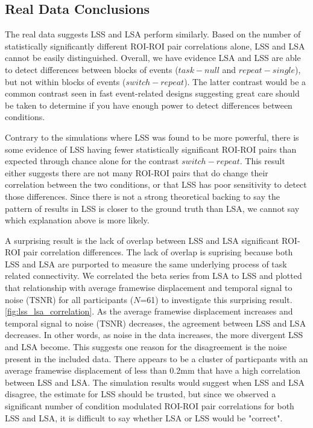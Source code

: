 \documentclass[10pt,letterpaper]{article}
\begin{document}
\subsection*{Real Data Conclusions}
\label{discussion:taskswitching-conclusions}

The real data suggests LSS and LSA perform similarly.
Based on the number of statistically significantly different ROI-ROI pair correlations alone,
LSS and LSA cannot be easily distinguished.
Overall, we have evidence LSA and LSS are able to detect differences between
blocks of events ($task - null$ and $repeat - single$), but not within blocks of events ($switch - repeat$).
The latter contrast would be a common contrast seen in fast event-related designs suggesting
great care should be taken to determine if you have enough power to detect differences
between conditions.

Contrary to the simulations where LSS was found to be more powerful,
there is some evidence of LSS having fewer statistically significant ROI-ROI pairs than expected through chance alone
for the contrast $switch - repeat$.
This result either suggests there are not many ROI-ROI pairs that do change their correlation
between the two conditions, or that LSS has poor sensitivity to detect those differences.
Since there is not a strong theoretical backing to say the pattern of results
in LSS is closer to the ground truth than LSA, we cannot say which
explanation above is more likely.

A surprising result is the lack of overlap between LSS and LSA significant ROI-ROI pair correlation differences.
The lack of overlap is suprising because both LSS and LSA are purported to
measure the same underlying process of task related connectivity.
We correlated the beta series from LSA to LSS and plotted that relationship with
average framewise displacement and temporal signal to noise (TSNR) for all participants ($N$=61) to investigate this surprising result. \ref{fig:lss_lsa_correlation}.
As the average framewise displacement increases and temporal signal to noise (TSNR)
decreases, the agreement between LSS and LSA decreases.
In other words, as noise in the data increases, the more divergent LSS and LSA become.
This suggests one reason for the disagreement is the noise present in the included
data.
There appears to be a cluster of particpants with an average framewise displacement of
less than 0.2mm that have a high correlation between LSS and LSA.
The simulation results would suggest when LSS and LSA disagree, the estimate for LSS should be
trusted, but since we observed a significant number of condition modulated ROI-ROI pair correlations for both
LSS and LSA, it is difficult to say whether LSA or LSS would be "correct".
\end{document}
